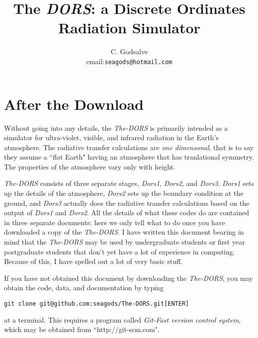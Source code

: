 \documentclass[12pt]{article}
\begin{document}


\thispagestyle{empty}

\title{ The {\it DORS}: a Discrete Ordinates Radiation Simulator}

\author{C. Godsalve \\
email:{\tt seagods@hotmail.com} }

\maketitle

\section{After the Download}


Without going into any details, the {\it The-DORS} is primarily intended as a simulator
for ultra-violet, visible, and infrared radiation in the Earth's atmosphere. 
The radiative transfer calculations are {\it one dimensonal}, that is to say they assume a ``flat Earth" having
an atmosphere that has tranlational symmetry. The properties of the atmosphere vary only with height.

{\it The-DORS} consists 
of three separate stages, {\it Dors1}, {\it Dors2}, and {\it Dors3}. {\it Dors1} sets up the
details of the atmosphere, {\it Dors2} sets up the boundary condition at the ground, and
{\it Dors3} actually does the radiative transfer calculations based on the output of {\it Dors1} and {\it Dors2}.
All the details of what these codes do are contained in three separate documents: here we only 
tell what to do once you have downloaded a copy of the {\it The-DORS}. I have written this document
 bearing in mind that the {\it The-DORS} may be used by undergraduate students or first
year postgraduate students that don't yet have a lot of experience in computing. Because of this, I have 
spelled out a lot of very basic stuff.

If you have not obtained this document by downloading the {\it The-DORS}, you may obtain the code, data, and documentation
by typing
\begin{verbatim}
git clone git@github.com:seagods/The-DORS.git[ENTER]
\end{verbatim} 
at a terminal. This requires a program called 
{\it Git-Fast version control system},
 which may be obtained from ``http://git-scm.com".
\end{document}
